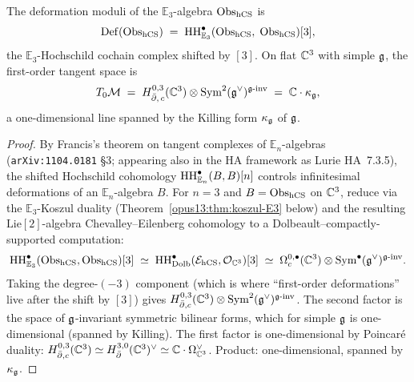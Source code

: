 \begin{theorem}\ClaimStatusTheorem
\label{opus13:thm:def-moduli}
The deformation moduli of the $\mathbb E_3$-algebra $\mathrm{Obs}_{\mathrm{hCS}}$ is
\begin{equation}
  \mathrm{Def}(\mathrm{Obs}_{\mathrm{hCS}}) \;=\; \mathrm{HH}^\bullet_{\mathbb E_3}
  (\mathrm{Obs}_{\mathrm{hCS}},\; \mathrm{Obs}_{\mathrm{hCS}})[3],
  \label{opus13:eq:def-moduli}
\end{equation}
the $\mathbb E_3$-Hochschild cochain complex shifted by $[3]$. On flat
$\mathbb{C}^3$ with simple $\mathfrak{g}$, the first-order tangent space is
\begin{equation}
  T_0 \mathcal{M} \;=\; H^{0,3}_{\bar\partial,\,c}(\mathbb{C}^3) \otimes
  \mathrm{Sym}^2(\mathfrak{g}^\vee)^{\mathfrak{g}\text{-inv}} \;=\; \mathbb{C} \cdot \kappa_{\mathfrak{g}},
  \label{opus13:eq:T-0-M}
\end{equation}
a one-dimensional line spanned by the Killing form $\kappa_{\mathfrak{g}}$ of
$\mathfrak{g}$.
\end{theorem}

\begin{proof}
By Francis's theorem on tangent complexes of $\mathbb E_n$-algebras
(\texttt{arXiv:1104.0181} \S3; appearing also in the HA framework as
Lurie HA~7.3.5), the shifted Hochschild cohomology
$\mathrm{HH}^\bullet_{\mathbb E_n}(B, B)[n]$ controls infinitesimal deformations
of an $\mathbb E_n$-algebra $B$. For $n = 3$ and $B = \mathrm{Obs}_{\mathrm{hCS}}$ on
$\mathbb{C}^3$, reduce via the $\mathbb E_3$-Koszul duality
(Theorem~\ref{opus13:thm:koszul-E3} below) and the resulting
$\mathrm{Lie}[2]$-algebra Chevalley--Eilenberg cohomology to a
Dolbeault--compactly-supported computation:
\[
  \mathrm{HH}^\bullet_{\mathbb E_3}(\mathrm{Obs}_{\mathrm{hCS}},\mathrm{Obs}_{\mathrm{hCS}})[3]
  \;\simeq\; \mathrm{HH}^\bullet_{\mathrm{Dolb}}(\mathcal{E}_{\mathrm{hCS}},\mathcal{O}_{\mathbb{C}^3})[3]
  \;\simeq\; \Omega^{0,\bullet}_c(\mathbb{C}^3)\otimes
  \mathrm{Sym}^\bullet(\mathfrak{g}^\vee)^{\mathfrak{g}\text{-inv}}.
\]
Taking the degree-$(-3)$ component (which is where ``first-order
deformations'' live after the shift by $[3]$) gives
$H^{0,3}_{\bar\partial,c}(\mathbb{C}^3) \otimes \mathrm{Sym}^2(\mathfrak{g}^\vee)^{\mathfrak{g}\text{-inv}}$.
The second factor is the space of $\mathfrak{g}$-invariant symmetric bilinear
forms, which for simple $\mathfrak{g}$ is one-dimensional (spanned by Killing).
The first factor is one-dimensional by Poincaré duality:
$H^{0,3}_{\bar\partial,c}(\mathbb{C}^3)
\simeq H^{3,0}_{\bar\partial}(\mathbb{C}^3)^\vee \simeq \mathbb{C}\cdot \Omega_{\mathbb{C}^3}^\vee$.
Product: one-dimensional, spanned by $\kappa_{\mathfrak{g}}$.
\end{proof}

